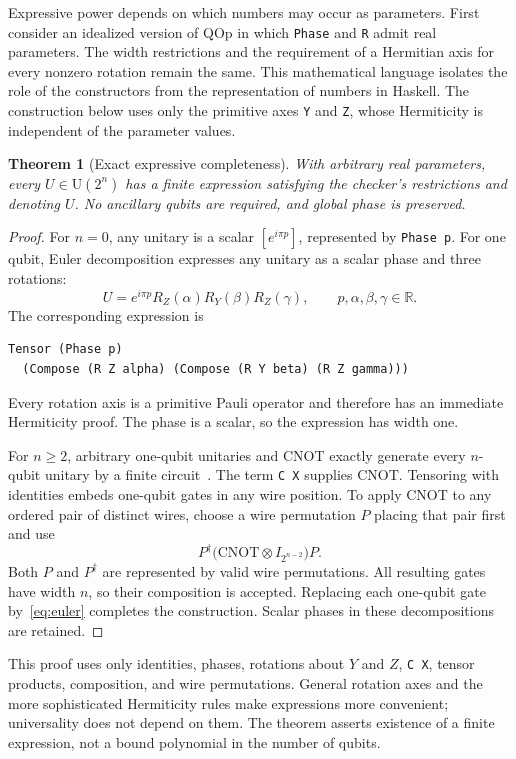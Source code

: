 \documentclass[11pt,a4paper]{article}
\newcommand{\R}{\mathbb R}
\newcommand{\U}{\mathrm U}
\newcommand{\code}[1]{\texttt{#1}}
\newcommand{\rot}[2]{R_{#1}(#2)}
\newtheorem{theorem}{Theorem}
\begin{document}
Expressive power depends on which numbers may occur as parameters.
First consider an idealized version of QOp in which \code{Phase} and
\code{R} admit real parameters. The width restrictions and the requirement
of a Hermitian axis for every nonzero rotation remain the same.
This mathematical language isolates the role of the constructors from
the representation of numbers in Haskell. The construction below uses
only the primitive axes \code{Y} and \code{Z}, whose Hermiticity is
independent of the parameter values.

\begin{theorem}[Exact expressive completeness]
With arbitrary real parameters, every $U\in\U(2^n)$ has a finite
expression satisfying the checker's restrictions and denoting $U$.
No ancillary qubits are required, and global phase is preserved.
\label{thm:complete}
\end{theorem}
\begin{proof}
For $n=0$, any unitary is a scalar $[e^{i\pi p}]$, represented by
\code{Phase p}. For one qubit, Euler decomposition expresses any
unitary as a scalar phase and three rotations:
\begin{equation}
  U=e^{i\pi p}\rot Z\alpha\rot Y\beta\rot Z\gamma,
  \qquad p,\alpha,\beta,\gamma\in\R.
  \label{eq:euler}
\end{equation}
The corresponding expression is
\begin{lstlisting}
Tensor (Phase p)
  (Compose (R Z alpha) (Compose (R Y beta) (R Z gamma)))
\end{lstlisting}
Every rotation axis is a primitive Pauli operator and therefore has
an immediate Hermiticity proof. The phase is a scalar, so the
expression has width one.

For $n\geq2$, arbitrary one-qubit unitaries and CNOT exactly generate
every $n$-qubit unitary by a finite circuit~\cite{barenco}.
The term \code{C X} supplies CNOT. Tensoring with identities embeds
one-qubit gates in any wire position. To apply CNOT to any ordered
pair of distinct wires, choose a wire permutation $P$ placing that
pair first and use
\[
  P^\dagger\bigl(\mathrm{CNOT}\otimes I_{2^{n-2}}\bigr)P.
\]
Both $P$ and $P^\dagger$ are represented by valid wire permutations.
All resulting gates have width $n$, so their composition is accepted.
Replacing each one-qubit gate by~\eqref{eq:euler} completes the
construction. Scalar phases in these decompositions are retained.
\end{proof}

This proof uses only identities, phases, rotations about $Y$ and $Z$,
\code{C X}, tensor products, composition, and wire permutations.
General rotation axes and the more sophisticated Hermiticity rules
make expressions more convenient; universality does not depend on them.
The theorem asserts existence of a finite expression, not a bound
polynomial in the number of qubits.
\end{document}
